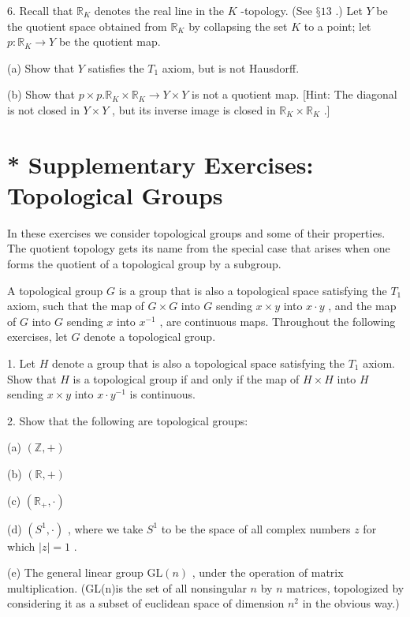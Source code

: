 6. Recall that \({\mathbb{R}}_{K}\) denotes the real line in the \(K\) -topology. (See \(§{13}\) .) Let \(Y\) be the quotient space obtained from \({\mathbb{R}}_{K}\) by collapsing the set \(K\) to a point; let \(p : {\mathbb{R}}_{K} \rightarrow  Y\) be the quotient map.

(a) Show that \(Y\) satisfies the \({T}_{1}\) axiom, but is not Hausdorff.

(b) Show that \(p \times  p.{\mathbb{R}}_{K} \times  {\mathbb{R}}_{K} \rightarrow  Y \times  Y\) is not a quotient map. [Hint: The diagonal is not closed in \(Y \times  Y\) , but its inverse image is closed in \({\mathbb{R}}_{K} \times  {\mathbb{R}}_{K}\) .]

\section*{* Supplementary Exercises: Topological Groups}

In these exercises we consider topological groups and some of their properties. The quotient topology gets its name from the special case that arises when one forms the quotient of a topological group by a subgroup.

A topological group \(G\) is a group that is also a topological space satisfying the \({T}_{1}\) axiom, such that the map of \(G \times  G\) into \(G\) sending \(x \times  y\) into \(x \cdot  y\) , and the map of \(G\) into \(G\) sending \(x\) into \({x}^{-1}\) , are continuous maps. Throughout the following exercises, let \(G\) denote a topological group.

1. Let \(H\) denote a group that is also a topological space satisfying the \({T}_{1}\) axiom. Show that \(H\) is a topological group if and only if the map of \(H \times  H\) into \(H\) sending \(x \times  y\) into \(x \cdot  {y}^{-1}\) is continuous.

2. Show that the following are topological groups:

(a) \(\left( {\mathbb{Z}, + }\right)\)

(b) \(\left( {\mathbb{R}, + }\right)\)

(c) \(\left( {{\mathbb{R}}_{ + }, \cdot  }\right)\)

(d) \(\left( {{S}^{1}, \cdot  }\right)\) , where we take \({S}^{1}\) to be the space of all complex numbers \(z\) for which \(\left| z\right|  = 1\) .

(e) The general linear group \(\mathrm{{GL}}\left( n\right)\) , under the operation of matrix multiplication. (GL(n)is the set of all nonsingular \(n\) by \(n\) matrices, topologized by considering it as a subset of euclidean space of dimension \({n}^{2}\) in the obvious way.)

